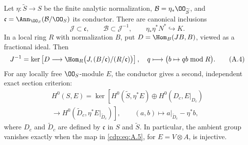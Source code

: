 
\begin{proposition}\label{cdp:st:A.2.2}
Let $\eta:\widetilde S\to S$ be the finite analytic normalization, $\mathcal B=\eta_*\OO_{\widetilde S}$, and $\mathfrak c=\Ann_{\OO_S}(\mathcal B/\OO_S)$ its conductor. There are canonical inclusions
\[
 \mathcal J\subset\mathfrak c,\qquad
 \mathcal B\subset\mathcal J^{-1},\qquad
 \eta_*\eta^*N^*\hookrightarrow K.
\tag{A.3}\label{cdp:eq:A.3}
\]
In a local ring $R$ with normalization $B$, put $D=\Hom_B(JB,B)$, viewed as a fractional ideal. Then
\[
 J^{-1}=\ker\left[D\longrightarrow
 \Hom_R\bigl(J,(B/\mathfrak c)/(R/\mathfrak c)\bigr)\right],
\quad q\longmapsto\bigl(b\mapsto qb\bmod R\bigr).
\tag{A.4}\label{cdp:eq:A.4}
\]
For any locally free $\OO_S$-module $E$, the conductor gives a second, independent exact section criterion:
\begin{multline}
H^0(S,E)=
\ker\left[H^0(\widetilde S,\eta^*E)\oplus H^0(D_c,E|_{D_c})\right.\\
\left.\longrightarrow H^0(\widetilde D_c,\eta^*E|_{\widetilde D_c})\right],
\qquad (a,b)\longmapsto a|_{\widetilde D_c}-\eta^*b,
\tag{A.5}\label{cdp:eq:A.5}
\end{multline}
where $D_c$ and $\widetilde D_c$ are defined by $\mathfrak c$ in $S$ and $\widetilde S$. In particular, the ambient group vanishes exactly when the map in \eqref{cdp:eq:A.5}, for $E=V\otimes A$, is injective.
\end{proposition}
